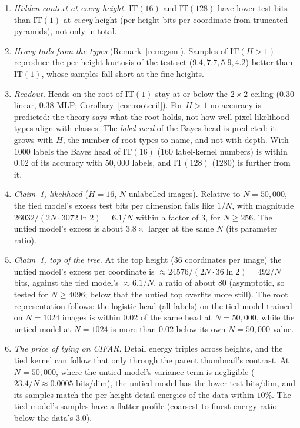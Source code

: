 \documentclass[11pt]{article}
\theoremstyle{definition}
\begin{document}
\begin{enumerate}
\item[(I1)] \emph{Hidden context at every height.} $\mathrm{IT}(16)$ and $\mathrm{IT}(128)$ have lower test bits
than $\mathrm{IT}(1)$ at \emph{every} height (per-height bits per coordinate from truncated pyramids), not only
in total.
\item[(I2)] \emph{Heavy tails from the types} (Remark~\ref{rem:gsm}). Samples of $\mathrm{IT}(H>1)$ reproduce the
per-height kurtosis of the test set ($9.4,7.7,5.9,4.2$) better than $\mathrm{IT}(1)$, whose samples fall short at
the fine heights.
\item[(I3)] \emph{Readout.} Heads on the root of $\mathrm{IT}(1)$ stay at or below the $2\times2$ ceiling
($0.30$ linear, $0.38$ MLP; Corollary~\ref{cor:rootceil}). For $H>1$ no accuracy is predicted: the theory says what
the root holds, not how well pixel-likelihood types align with classes. The \emph{label need} of the Bayes head is
predicted: it grows with $H$, the number of root types to name, and not with depth. With $1000$ labels the Bayes
head of $\mathrm{IT}(16)$ ($160$ label-kernel numbers) is within $0.02$ of its accuracy with $50{,}000$ labels,
and $\mathrm{IT}(128)$ ($1280$) is further from it.
\item[(I4)] \emph{Claim~1, likelihood} ($H=16$, $N$ unlabelled images). Relative to $N=50{,}000$, the tied model's
excess test bits per dimension falls like $1/N$, with magnitude $26032/(2N\cdot3072\ln2)=6.1/N$ within a factor
of $3$, for $N\ge256$. The untied model's excess is about $3.8\times$ larger at the same $N$ (its parameter
ratio).
\item[(I5)] \emph{Claim~1, top of the tree.} At the top height ($36$ coordinates per image) the untied model's excess
per coordinate is $\approx24576/(2N\cdot36\ln2)=492/N$ bits, against the tied model's $\approx6.1/N$, a ratio of about
$80$ (asymptotic, so tested for $N\ge4096$; below that the untied top overfits more still). The root
representation follows: the logistic head (all labels) on the tied model trained on $N=1024$ images is within
$0.02$ of the same head at $N=50{,}000$, while the untied model at $N=1024$ is more than $0.02$ below its own
$N=50{,}000$ value.
\item[(I6)] \emph{The price of tying on CIFAR.} Detail energy triples across heights, and the tied kernel can follow
that only through the parent thumbnail's contrast. At $N=50{,}000$, where the untied model's variance term is
negligible ($23.4/N\approx0.0005$ bits/dim), the untied model has the lower test bits/dim, and its samples match
the per-height detail energies of the data within $10\%$. The tied model's samples have a flatter profile
(coarsest-to-finest energy ratio below the data's $3.0$).
\end{enumerate}
\end{document}
